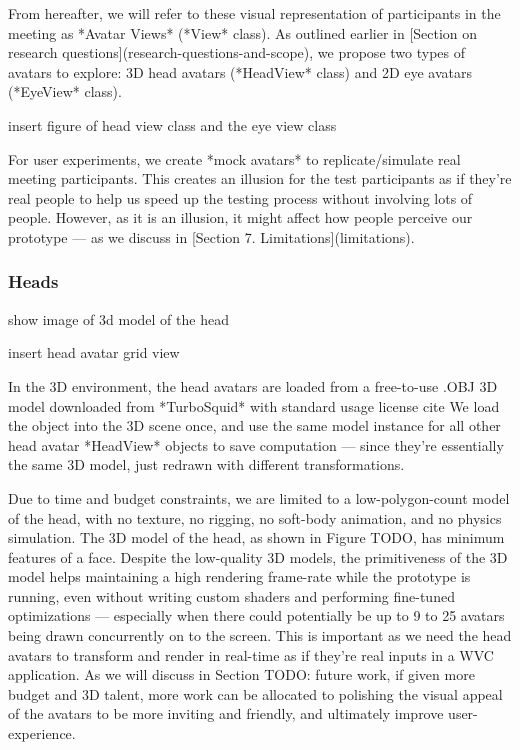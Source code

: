 From hereafter, we will refer to these visual representation of participants in the meeting as *Avatar Views* (*View* class). As outlined earlier in [Section on research questions](research-questions-and-scope), we propose two types of avatars to explore: 3D head avatars (*HeadView* class) and 2D eye avatars (*EyeView* class). 

insert figure of head view class and the eye view class

For user experiments, we create *mock avatars* to replicate/simulate real meeting participants. This creates an illusion for the test participants as if they’re real people to help us speed up the testing process without involving lots of people. However, as it is an illusion, it might affect how people perceive our prototype --- as we discuss in [Section 7. Limitations](limitations). 


\subsubsection{Heads}

show image of 3d model of the head

insert head avatar grid view

In the 3D environment, the head avatars are loaded from a free-to-use .OBJ 3D model downloaded from *TurboSquid* with standard usage license cite 
We load the object into the 3D scene once, and use the same model instance for all other head avatar *HeadView* objects to save computation --- since they’re essentially the same 3D model, just redrawn with different transformations.

Due to time and budget constraints, we are limited to a low-polygon-count model of the head, with no texture, no rigging, no soft-body animation, and no physics simulation. The 3D model of the head, as shown in Figure TODO, has minimum features of a face. Despite the low-quality 3D models, the primitiveness of the 3D model helps maintaining a high rendering frame-rate while the prototype is running, even without writing custom shaders and performing fine-tuned optimizations --- especially when there could potentially be up to 9 to 25 avatars being drawn concurrently on to the screen. This is important as we need the head avatars to transform and render in real-time as if they’re real inputs in a WVC application.
As we will discuss in Section TODO: future work, if given more budget and 3D talent, more work can be allocated to polishing the visual appeal of the avatars to be more inviting and friendly, and ultimately improve user-experience.

